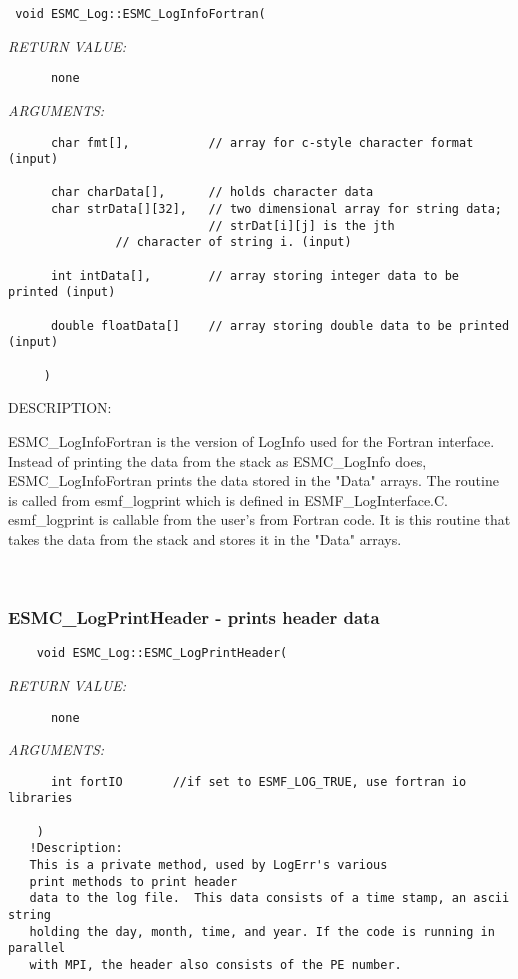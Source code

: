   
\begin{verbatim} 
 void ESMC_Log::ESMC_LogInfoFortran(
 \end{verbatim}{\em RETURN VALUE:}
\begin{verbatim}      none\end{verbatim}{\em ARGUMENTS:}
\begin{verbatim}      
      char fmt[],           // array for c-style character format (input)
 
      char charData[],      // holds character data
      char strData[][32],   // two dimensional array for string data;
                            // strDat[i][j] is the jth
 			   // character of string i. (input)
 
      int intData[],        // array storing integer data to be printed (input)
 
      double floatData[]    // array storing double data to be printed (input) 
 
     )\end{verbatim}
{\sf DESCRIPTION:\\ }


   ESMC\_LogInfoFortran is the version of LogInfo used for the Fortran
   interface.  Instead of printing the data from the stack as ESMC\_LogInfo 
   does, ESMC\_LogInfoFortran prints the data stored in the "Data" arrays. 
   The routine is called from esmf\_logprint which is  defined in
   ESMF\_LogInterface.C.  esmf\_logprint is callable from the user's
   from Fortran code.  It is this routine that takes the data
   from the stack and stores it in the "Data" arrays.
  
   
 
\mbox{}\hrulefill\ 
 
\subsubsection [ESMC\_LogPrintHeader] {ESMC\_LogPrintHeader - prints header data}


  
\begin{verbatim}    void ESMC_Log::ESMC_LogPrintHeader(\end{verbatim}{\em RETURN VALUE:}
\begin{verbatim}      none \end{verbatim}{\em ARGUMENTS:}
\begin{verbatim}      int fortIO       //if set to ESMF_LOG_TRUE, use fortran io libraries
 
    )
   !Description:
   This is a private method, used by LogErr's various
   print methods to print header
   data to the log file.  This data consists of a time stamp, an ascii string 
   holding the day, month, time, and year. If the code is running in parallel
   with MPI, the header also consists of the PE number.\end{verbatim}
 
